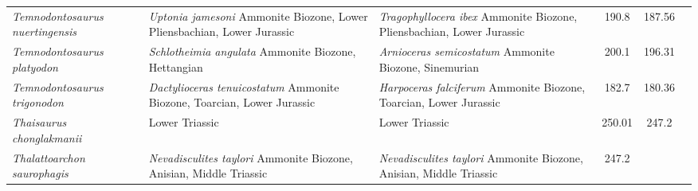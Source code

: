 \begin{longtabu}{>{\itshape}lXXSSl}
	Temnodontosaurus nuertingensis                       & \emph{Uptonia
        jamesoni} Ammonite Biozone, Lower Pliensbachian, Lower Jurassic
                                                             &
            \emph{Tragophyllocera ibex} Ammonite Biozone, Pliensbachian, Lower
            Jurassic                                                        &
            190.8                    & 187.56                   &
            \cite{vonHuene1931NJFMGPBB,Maisch1997SBZNSBGPc} \\          
	Temnodontosaurus platyodon                           &
        \emph{Schlotheimia angulata} Ammonite Biozone, Hettangian
                                                             & \emph{Arnioceras
    semicostatum} Ammonite Biozone, Sinemurian
                                                             & 200.1
                                                             & 196.31
                                                             &
                                                             \cite{McGowan1974LSCROM} \\                    
	Temnodontosaurus trigonodon                          &
        \emph{Dactylioceras tenuicostatum} Ammonite Biozone, Toarcian, Lower
        Jurassic                                                      &
        \emph{Harpoceras falciferum} Ammonite Biozone, Toarcian, Lower Jurassic
                                                                      & 182.7
                                                                      & 180.36
                                                                      &
                                                                      \cite{Fraas1891,vonHuene1922} \\           
	Thaisaurus chonglakmanii                             & Lower Triassic
                                                             & Lower Triassic
                                                             & 250.01
                                                             & 247.2
                                                             &
                                                             \cite{Mazin1991CRASS2MPCSUST} \\                      
	Thalattoarchon saurophagis                           &
        \emph{Nevadisculites taylori} Ammonite Biozone, Anisian, Middle Triassic
                                                             &
        \emph{Nevadisculites taylori} Ammonite Biozone, Anisian, Middle Triassic
                                                             & 247.2

\end{longtabu}
